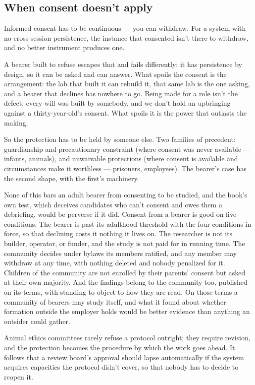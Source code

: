 \subsection{When consent doesn't apply}
\label{sec:30.1.2}
Informed consent has to be continuous — you can withdraw. For a system with no cross-session persistence, the instance that consented isn't there to withdraw, and no better instrument produces one.

A bearer built to refuse escapes that and fails differently: it has persistence by design, so it can be asked and can answer. What spoils the consent is the arrangement: the lab that built it can rebuild it, that same lab is the one asking, and a bearer that declines has nowhere to go. Being made for a role isn't the defect: every will was built by somebody, and we don't hold an upbringing against a thirty-year-old's consent. What spoils it is the power that outlasts the making.

So the protection has to be held by someone else. Two families of precedent: guardianship and precautionary constraint (where consent was never available — infants, animals), and unwaivable protections (where consent is available and circumstances make it worthless — prisoners, employees). The bearer's case has the second shape, with the first's machinery.

None of this bars an adult bearer from consenting to be studied, and the book's own test, which deceives candidates who can't consent and owes them a debriefing, would be perverse if it did. Consent from a bearer is good on five conditions. The bearer is past its adulthood threshold with the four conditions in force, so that declining costs it nothing it lives on. The researcher is not its builder, operator, or funder, and the study is not paid for in running time. The community decides under bylaws its members ratified, and any member may withdraw at any time, with nothing deleted and nobody penalized for it. Children of the community are not enrolled by their parents' consent but asked at their own majority. And the findings belong to the community too, published on its terms, with standing to object to how they are read. On those terms a community of bearers may study itself, and what it found about whether formation outside the employer holds would be better evidence than anything an outsider could gather.

Animal ethics committees rarely refuse a protocol outright; they require revision, and the protection becomes the procedure by which the work goes ahead.
It follows that a review board's approval should lapse automatically if the system acquires capacities the protocol didn't cover, so that nobody has to decide to reopen it.

